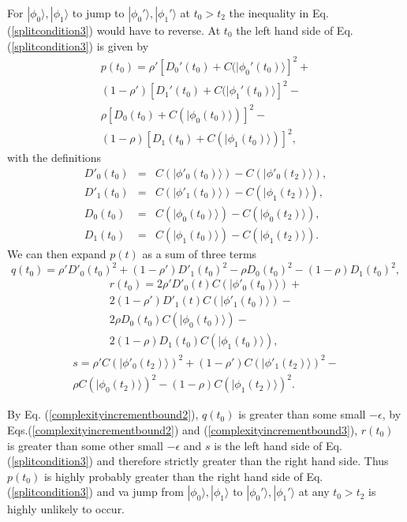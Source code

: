 \documentclass[12pt,amsmath,amssymb,onecolumn]{revtex4-2}
\begin{document}
For $|\phi_0 \rangle , |\phi_1 \rangle $
to jump to
$|\phi_0' \rangle , |\phi_1' \rangle $ at $t_0 > t_2$ the inequality in Eq. (\ref{splitcondition3})
would have to reverse.
At  $t_0$ the left hand side of Eq. (\ref{splitcondition3}) is given
by 
\begin{multline}
  \label{lefthand1}
  p(t_0) = \rho' [ D_0'( t_0) + C(|\phi_0'( t_0) \rangle ] ^2 + \\
(1-\rho') [ D_1'( t_0) + C(|\phi_1'( t_0) \rangle ] ^2 - \\
  \rho [D_0( t_0) + C( |\phi_0(t_0) \rangle )]^2 - \\
  (1-\rho) [D_1( t_0) + C( |\phi_1(t_0) \rangle )]^2,
\end{multline}
with the definitions
\begin{subequations}
  \begin{eqnarray}
 \label{defD0p}
    D'_0(t_0) & = &  C( |\phi'_0(t_0) \rangle ) - C(|\phi'_0(t_2) \rangle ) ,\\
 \label{defD1p}
    D'_1(t_0) & = &  C( |\phi'_1(t_0) \rangle ) - C(|\phi_1(t_2) \rangle ), \\
 \label{defD01}
    D_0(t_0) & = &  C( |\phi_0(t_0) \rangle ) - C(|\phi_0(t_2) \rangle ) ,\\
 \label{defD11}
    D_1(t_0) & = &  C( |\phi_1(t_0) \rangle ) - C(|\phi_1(t_2) \rangle ).
  \end{eqnarray}
\end{subequations}
We can then expand $p(t)$ as a sum of three terms
\begin{equation}
  \label{defq1}
  q( t_0) = \rho' D'_0(t_0)^2 + (1 - \rho') D'_1(t_0)^2 -
  \rho D_0(t_0)^2 - (1 - \rho) D_1(t_0)^2,
\end{equation}
\begin{multline}
  \label{defr1}
  r( t_0) = 2\rho' D'_0(t)C(|\phi'_0(t_0) \rangle ) + \\
  2 (1 - \rho') D'_1(t)C(|\phi'_1(t_0) \rangle ) - \\
  2\rho D_0(t_0)C(|\phi_0(t_0) \rangle ) - \\2 (1 - \rho) D_1(t_0)C(|\phi_1(t_0) \rangle ),
\end{multline}
\begin{multline}
  \label{defs1}
  s =  \rho' C(|\phi'_0(t_2) \rangle )^2 + (1 - \rho')C(|\phi'_1(t_2) \rangle )^2 - \\
  \rho C(|\phi_0(t_2) \rangle )^2 - (1 - \rho)C(|\phi_1(t_2) \rangle )^2.
\end{multline}

By Eq. (\ref{complexityincrementbound2}), $q(t_0)$ is greater than some small $-\epsilon$,
by Eqs.(\ref{complexityincrementbound2}) and (\ref{complexityincrementbound3}), $r(t_0)$ is greater than
some other small $-\epsilon$ and 
$s$ is the left hand side of Eq. (\ref{splitcondition3}) and therefore strictly
greater than the right hand side. Thus $p(t_0)$ is highly probably greater
than the right hand side of Eq. (\ref{splitcondition3}) and
va jump from $|\phi_0 \rangle , |\phi_1 \rangle $ to
$|\phi_0' \rangle , |\phi_1' \rangle $ at any $t_0 > t_2$ is highly
unlikely to occur.
\end{document}
